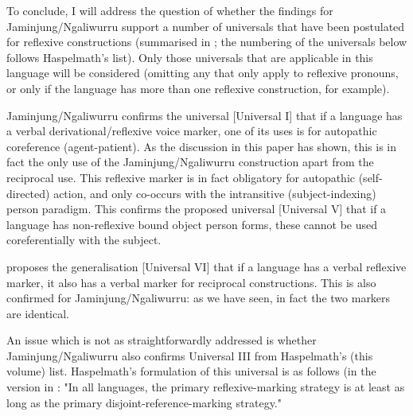 \documentclass[output=paper,colorlinks,citecolor=brown]{langscibook}
\begin{document}
To conclude, I will address the question of whether the findings for Jaminjung/Ngaliwurru support a number of universals that have been postulated for reflexive constructions (summarised in \citealt{haspelmath_thisvolume}; the numbering of the universals below follows Haspelmath’s list). Only those universals that are applicable in this language will be considered (omitting any that only apply to reflexive pronouns, or only if the language has more than one reflexive construction, for example).

Jaminjung/Ngaliwurru confirms the universal [Universal I] that if a language has a verbal derivational/reflexive voice marker, one of its uses is for autopathic coreference (agent-patient). As the discussion in this paper has shown, this is in fact the only use of the Jaminjung/Ngaliwurru construction apart from the reciprocal use. This reflexive marker is in fact obligatory for autopathic (self-directed) action, and only co-occurs with the intransitive (subject-indexing) person paradigm. This confirms the proposed universal [Universal V] that if a language has non-reflexive bound object person forms, these cannot be used coreferentially with the subject.

\citet[141]{Dixon2012} proposes the generalisation [Universal VI] that if a language has a verbal reflexive marker, it also has a verbal marker for reciprocal constructions. This is also confirmed for Jaminjung/Ngaliwurru: as we have seen, in fact the two markers are identical. 

An issue which is not as straightforwardly addressed is whether Jaminjung/Ngaliwurru also confirms Universal III from Haspelmath's (this volume) list. Haspelmath's formulation of this universal is as follows (in the version in \citealt[48]{Haspelmath2008}: "In all languages, the primary reflexive-marking strategy is at least as long as the primary disjoint-reference-marking strategy."
\end{document}
